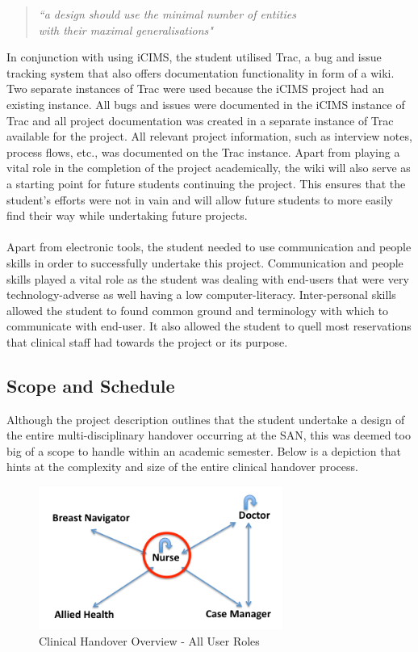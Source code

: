 \begin{quote}
\center\emph{``a design should use the minimal number of entities \\ with their maximal generalisations"}
\end{quote}
\vspace{6mm}
\noindent In conjunction with using iCIMS, the student utilised Trac, a bug and issue tracking system that also offers documentation functionality in form of a wiki. Two separate instances of Trac were used because the iCIMS project had an existing instance. All bugs and issues were documented in the iCIMS instance of Trac and all project documentation was created in a separate instance of Trac available for the project. All relevant project information, such as interview notes, process flows, etc., was documented on the Trac instance. Apart from playing a vital role in the completion of the project academically, the wiki will also serve as a starting point for future students continuing the project. This ensures that the student's efforts were not in vain and will allow future students to more easily find their way while undertaking future projects.
\\ \\
Apart from electronic tools, the student needed to use communication and people skills in order to successfully undertake this project. Communication and people skills played a vital role as the student was dealing with end-users that were very technology-adverse as well having a low computer-literacy. Inter-personal skills allowed the student to found common ground and terminology with which to communicate with end-user. It also allowed the student to quell most reservations that clinical staff had towards the project or its purpose.

\newpage
\subsection{Scope and Schedule}
Although the project description outlines that the student undertake a design of the entire multi-disciplinary handover occurring at the SAN, this was deemed too big of a scope to handle within an academic semester. Below is a depiction that hints at the complexity and size of the entire clinical handover process.

\begin{figure}[hp]
				\centering
				\includegraphics[scale=1.0, width=80mm]{Images/Clinical_Handover_All_Roles}
				\caption{Clinical Handover Overview - All User Roles}
\end{figure} 

